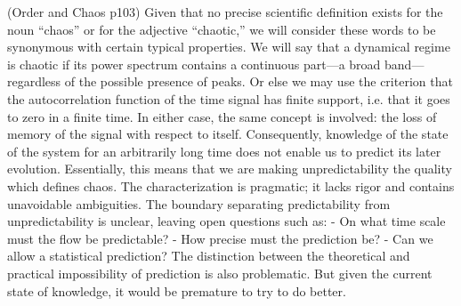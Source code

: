 \documentclass[11pt]{book}
\begin{document}
(Order and Chaos p103)
Given that no precise scientific definition exists for the noun ``chaos'' or for the adjective ``chaotic,'' we will consider these words to be synonymous with certain typical properties.
We will say that a dynamical regime is chaotic if its power spectrum contains a continuous part---a broad band---regardless of the possible presence of peaks.
Or else we may use the criterion that the autocorrelation function of the time signal has finite support, i.e. that it goes to zero in a finite time.
In either case, the same concept is involved: the loss of memory of the signal with respect to itself.
Consequently, knowledge of the state of the system for an arbitrarily long time does not enable us to predict its later evolution.
Essentially, this means that we are making unpredictability the quality which defines chaos.
The characterization is pragmatic; it lacks rigor and contains unavoidable ambiguities.
The boundary separating predictability from unpredictability is unclear, leaving open questions such as:
- On what time scale must the flow be predictable?
- How precise must the prediction be?
- Can we allow a statistical prediction?
The distinction between the theoretical and practical impossibility of prediction is also problematic.
But given the current state of knowledge, it would be premature to try to do better.




\printindex
\end{document}
